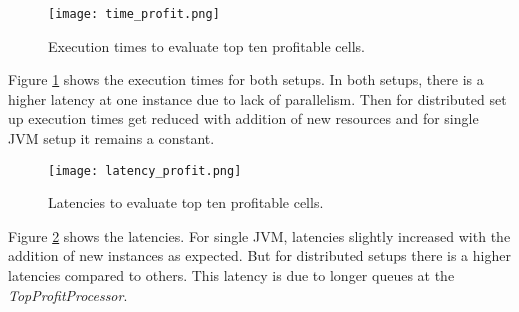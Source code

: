 \begin{figure}[!t]
        \centering
        \texttt{[image: time\_profit.png]}
        \caption{Execution times to evaluate top ten profitable cells.}
        \label{time_profit}
\end{figure}
 
Figure \ref{time_profit} shows the execution times for both setups. In both setups, there is a higher latency at one instance due to lack of parallelism. Then for distributed set up execution times get reduced with addition of new resources and for single JVM setup it remains a constant. 


\begin{figure}[!t]
        \centering
        \texttt{[image: latency\_profit.png]}
        \caption{Latencies to evaluate top ten profitable cells.}
        \label{latency_profit}
\end{figure}

Figure \ref{latency_profit} shows the latencies. For single JVM, latencies slightly increased with the addition of new instances as expected. But for distributed setups there is a higher latencies compared to others. This latency is due to longer queues at the \textit{TopProfitProcessor}.


